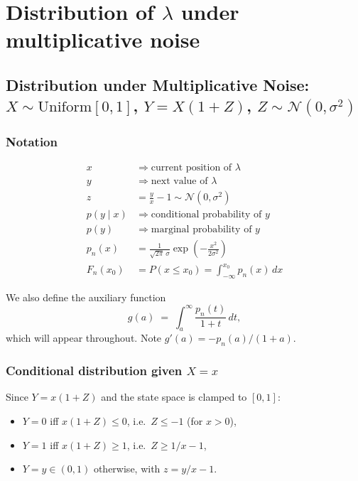 \section{Distribution of $\lambda$ under multiplicative noise}
\label{MultiplicativeStationary}

\subsection*{Distribution under Multiplicative Noise:
  $X \sim \mathrm{Uniform}[0,1]$, $Y = X(1 + Z)$, $Z \sim \mathcal{N}(0,\sigma^2)$}

\subsubsection*{Notation}
\begin{align*}
  x &\Rightarrow \text{current position of } \lambda \\
  y &\Rightarrow \text{next value of } \lambda \\
  z &= \frac{y}{x} - 1 \sim \mathcal{N}(0,\sigma^2) \\
  p(y \mid x) &\Rightarrow \text{conditional probability of } y \\
  p(y) &\Rightarrow \text{marginal probability of } y \\
  p_n(x) &= \frac{1}{\sqrt{2\pi}\,\sigma}
            \exp\!\left(-\frac{x^2}{2\sigma^2}\right) \\
  F_n(x_0) &= P(x \leq x_0) = \int_{-\infty}^{x_0} p_n(x)\,dx
\end{align*}

We also define the auxiliary function
\begin{equation}
  g(a) \;=\; \int_a^{\infty} \frac{p_n(t)}{1+t}\,dt,
  \label{eq:gdef}
\end{equation}
which will appear throughout. Note $g'(a) = -p_n(a)/(1+a)$.

\subsubsection*{Conditional distribution given $X = x$}

Since $Y = x(1+Z)$ and the state space is clamped to $[0,1]$:
\begin{itemize}
  \item $Y = 0$ iff $x(1+Z) \leq 0$, i.e.\ $Z \leq -1$ (for $x > 0$),
  \item $Y = 1$ iff $x(1+Z) \geq 1$, i.e.\ $Z \geq 1/x - 1$,
  \item $Y = y \in (0,1)$ otherwise, with $z = y/x - 1$.
\end{itemize}


